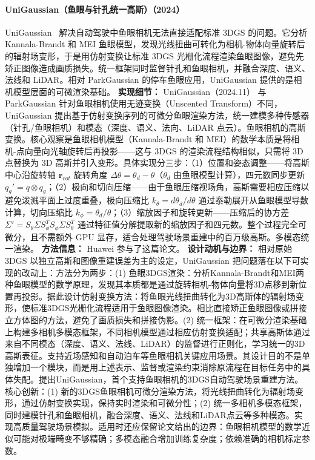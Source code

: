 \paragraph{UniGaussian（鱼眼与针孔统一高斯）（2024）}
UniGaussian~\cite{2411_15355} 解决自动驾驶中鱼眼相机无法直接适配标准 3DGS 的问题。它分析 Kannala-Brandt 和 MEI 鱼眼模型，发现光线扭曲可转化为相机-物体向量旋转后的辐射场变形，于是用仿射变换让标准 3DGS 光栅化流程渲染鱼眼图像，避免先矫正图像造成画质损失。统一框架同时监督针孔和鱼眼相机，并融合深度、语义、法线和 LiDAR。相对 ParkGaussian 的停车鱼眼应用，UniGaussian 提供的是相机模型层面的可微渲染基础。
\textbf{实现细节：} UniGaussian（2024.11） 与 ParkGaussian 针对鱼眼相机使用无迹变换（Unscented Transform）不同，UniGaussian 提出基于仿射变换序列的可微分鱼眼渲染方法，统一建模多种传感器（针孔/鱼眼相机）和模态（深度、语义、法向、LiDAR 点云）。鱼眼相机的高斯变换。核心观察是鱼眼相机模型（Kannala-Brandt 和 MEI）的数学本质是将相机-点向量向光轴旋转后再投影——这与 3DGS 的渲染流程结构相似，只需将 3D 点替换为 3D 高斯并引入变形。具体实现分三步：（1）位置和姿态调整——将高斯中心沿旋转轴 $\mathbf{r}_{rot}$ 旋转角度 $\Delta\theta = \theta_d - \theta$（$\theta_d$ 由鱼眼模型计算），四元数同步更新 $q_g' = q \otimes q_g$；（2）极向和切向压缩——由于鱼眼压缩视场角，高斯需要相应压缩以避免泼溅平面上过度重叠，极向压缩比 $k_\theta = d\theta_d / d\theta$ 通过泰勒展开从鱼眼模型导数计算，切向压缩比 $k_\phi = \theta_d / \theta$；（3）缩放因子和旋转更新——压缩后的协方差 $\Sigma' = S_\theta \Sigma S_\phi^T S_\phi \Sigma S_\theta^T$ 通过特征值分解提取新的缩放因子和四元数。整个过程完全可微分，且不需额外 GPU 显存，适合处理驾驶场景重建中的百万级高斯。多模态统一渲染。
\textbf{方法信息：} Huawei 参与了这篇论文。
\textbf{设计动机与边界：} 相对原始 3DGS 以独立高斯和图像重建误差为主的设定，UniGaussian 把问题落在以下可实现的改动上：方法分为两步：(1) 鱼眼3DGS渲染：分析Kannala-Brandt和MEI两种鱼眼模型的数学原理，发现其本质都是通过旋转相机-物体向量将3D点移到新位置再投影。据此设计仿射变换方法：将鱼眼光线扭曲转化为3D高斯体的辐射场变形，使标准3DGS光栅化流程适用于鱼眼图像渲染。相比直接矫正鱼眼图像或拼接立方体图的方法，避免了画质损失和拼接伪影。(2) 统一框架：在可微分渲染基础上构建多相机多模态框架，不同相机模型通过相应仿射变换适配；共享高斯体通过来自不同模态（深度、语义、法线、LiDAR）的监督进行正则化，学习统一的3D高斯表征。支持近场感知和自动泊车等鱼眼相机关键应用场景。其设计目的不是单独增加一个模块，而是用上述表示、监督或渲染约束消除原流程在目标任务中的具体失配。提出UniGaussian，首个支持鱼眼相机的3DGS自动驾驶场景重建方法。核心创新：(1) 新的3DGS鱼眼相机可微分渲染方法，将光线扭曲转化为辐射场变形，通过仿射变换实现，保持实时渲染和可微分性；(2) 统一多相机多模态框架，同时建模针孔和鱼眼相机，融合深度、语义、法线和LiDAR点云等多种模态。实现高质量驾驶场景模拟。适用时还应保留论文给出的边界：鱼眼相机模型的数学近似可能对极端畸变不够精确；多模态融合增加训练复杂度；依赖准确的相机标定参数。
